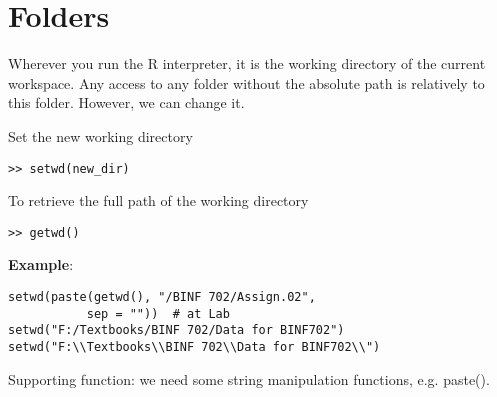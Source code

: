 
\chapter{Folders}
\label{chap:folders}


Wherever you run the R interpreter, it is the working directory of the
current workspace. Any access to any folder without the absolute path
is relatively to this folder. However, we can change it.

\textbullet Set the new working directory
\begin{lstlisting}
>> setwd(new_dir)
\end{lstlisting}

\textbullet To retrieve the full path of the working directory
\begin{lstlisting}
>> getwd()
\end{lstlisting}

{\bf Example}:
\begin{lstlisting}
setwd(paste(getwd(), "/BINF 702/Assign.02", 
           sep = ""))  # at Lab
setwd("F:/Textbooks/BINF 702/Data for BINF702")
setwd("F:\\Textbooks\\BINF 702\\Data for BINF702\\")
\end{lstlisting}

Supporting function: we need some string manipulation functions,
e.g. paste().


